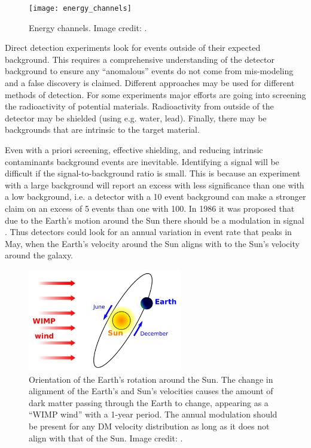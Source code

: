 \begin{figure}
\centering
\texttt{[image: energy\_channels]}
\caption{Energy channels.  Image credit: .}
\label{fig:energy_channels}
\end{figure}
 
Direct detection experiments look for events outside of their expected background.  This requires a comprehensive
understanding of the detector background to ensure any ``anomalous'' events do not come from mis-modeling and a false discovery is
claimed.  Different approaches may be
used for different methods of detection.  For some experiments major efforts are going into screening the radioactivity of
potential materials.  Radioactivity from outside of the detector may be shielded (using e.g. water, lead).  Finally, there may be
backgrounds that are intrinsic to the target material.

 
Even with a priori screening, effective shielding, and reducing intrinsic contaminants background events are inevitable.  Identifying a
signal will be difficult if the signal-to-background ratio is small.  This is because
an experiment with a large background will report an excess with less significance than one with a low background, i.e. a detector with a
10 event
background can make a stronger claim on an excess of 5 events than one with 100.  In 1986 it was proposed
that due to the Earth's motion around the Sun there should be a modulation in signal .  Thus
detectors could look for an annual variation in event rate that peaks in May, when the Earth's velocity around the
Sun aligns with to the Sun's velocity around the galaxy.

\begin{figure}
\includegraphics[width=0.6\textwidth]{wimp_wind}
\caption[Orientation of the Earth's rotation around the Sun.  The change in alignment of the Earth's and Sun's velocities causes the
amount of dark matter passing through the Earth to change, appearing as a ``WIMP wind'' with a 1-year period.  Image credit:
.]{Orientation of the Earth's rotation around the Sun.  The change in alignment of the Earth's and Sun's velocities causes the
amount of dark matter passing through the Earth to change, appearing as a ``WIMP wind'' with a 1-year period.  The annual modulation
should be present for any DM velocity distribution as long as it does not align with that of the Sun.  Image credit:
.}
\label{fig:direct_detect_modulation}
\end{figure}
 
